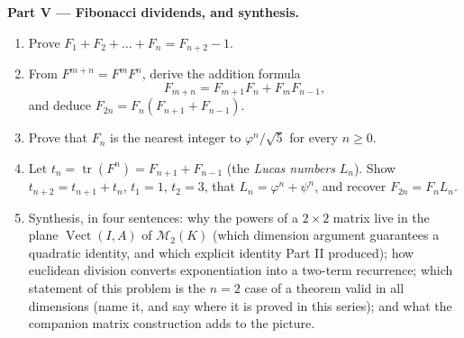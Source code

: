 \begin{problem}
\medskip
\noindent\textbf{Part V --- Fibonacci dividends, and synthesis.}
\begin{enumerate}[resume]
  \item Prove $F_1 + F_2 + \dots + F_n = F_{n+2} - 1$.
  \item From $F^{m+n} = F^m F^n$, derive the addition formula
        \[
        F_{m+n} = F_{m+1}F_n + F_m F_{n-1},
        \]
        and deduce $F_{2n} = F_n(F_{n+1} + F_{n-1})$.
  \item Prove that $F_n$ is the nearest integer to
        $\varphi^n/\sqrt5$ for every $n \geq 0$.
  \item Let $t_n = \operatorname{tr}(F^n) = F_{n+1} + F_{n-1}$
        (the \emph{Lucas numbers} $L_n$). Show $t_{n+2} =
        t_{n+1} + t_n$, $t_1 = 1$, $t_2 = 3$, that $L_n =
        \varphi^n + \psi^n$, and recover $F_{2n} = F_n L_n$.
  \item Synthesis, in four sentences: why the powers of a $2
        \times 2$ matrix live in the plane
        $\operatorname{Vect}(I, A)$ of $\mathcal{M}_2(K)$ (which
        dimension argument guarantees a quadratic identity, and
        which explicit identity Part II produced); how euclidean
        division converts exponentiation into a two-term
        recurrence; which statement of this problem is the $n =
        2$ case of a theorem valid in all dimensions (name it,
        and say where it is proved in this series); and what the
        companion matrix construction adds to the picture.
\end{enumerate}
\end{problem}
